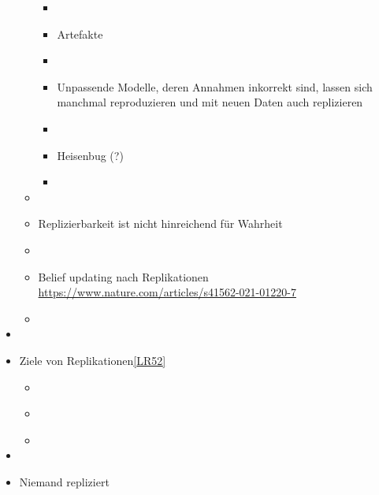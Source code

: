 \documentclass[
  letterpaper,
  DIV=11,
  numbers=noendperiod]{scrreprt}
\begin{document}
\begin{itemize}
\begin{itemize}
    \begin{itemize}
    \item
    \item
      Artefakte
    \item
    \item
      Unpassende Modelle, deren Annahmen inkorrekt sind, lassen sich
      manchmal reproduzieren und mit neuen Daten auch replizieren
    \item
    \item
      Heisenbug (?)
    \item
    \end{itemize}
  \item
  \item
    Replizierbarkeit ist nicht hinreichend für Wahrheit
  \item
  \item
    Belief updating nach Replikationen
    \url{https://www.nature.com/articles/s41562-021-01220-7}
  \item
  \end{itemize}
\item
\item
  Ziele von Replikationen\hyperref[_msocom_52]{{[}LR52{]}}~

  \begin{itemize}
  \item
  \item
    ~
  \item
  \end{itemize}
\item
\item
  Niemand repliziert


\end{itemize}
\end{document}
